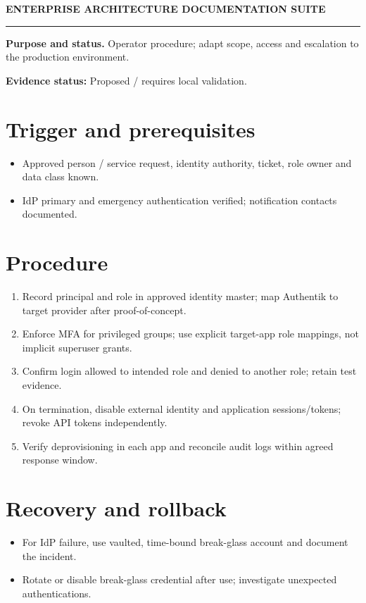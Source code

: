 \documentclass[10pt,letterpaper]{article}
\begin{document}
\begin{center}
{\large\bfseries\color{teal} ENTERPRISE ARCHITECTURE DOCUMENTATION SUITE}\par
{}\par
{}\par
\end{center}
\vspace{8pt}\hrule\vspace{12pt}
\textbf{Purpose and status.} Operator procedure; adapt scope, access and escalation to the production environment.\par
\textbf{Evidence status:} Proposed / requires local validation.\par
\section{Trigger and prerequisites}
\begin{itemize}
\item Approved person / service request, identity authority, ticket, role owner and data class known.
\item IdP primary and emergency authentication verified; notification contacts documented.
\end{itemize}
\section{Procedure}
\begin{enumerate}
\item Record principal and role in approved identity master; map Authentik to target provider after proof-of-concept.
\item Enforce MFA for privileged groups; use explicit target-app role mappings, not implicit superuser grants.
\item Confirm login allowed to intended role and denied to another role; retain test evidence.
\item On termination, disable external identity and application sessions/tokens; revoke API tokens independently.
\item Verify deprovisioning in each app and reconcile audit logs within agreed response window.
\end{enumerate}
\section{Recovery and rollback}
\begin{itemize}
\item For IdP failure, use vaulted, time-bound break-glass account and document the incident.
\item Rotate or disable break-glass credential after use; investigate unexpected authentications.
\end{itemize}
\end{document}
